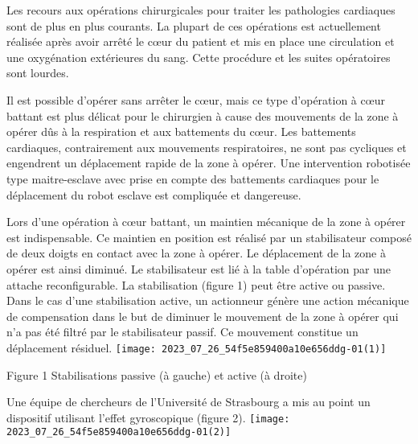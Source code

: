 %
%
%
%
%

Les recours aux opérations chirurgicales pour traiter les pathologies cardiaques sont de plus en plus courants. La plupart de ces opérations est actuellement réalisée après avoir arrêté le cœur du patient et mis en place une circulation et une oxygénation extérieures du sang. Cette procédure et les suites opératoires sont lourdes.

Il est possible d'opérer sans arrêter le cœur, mais ce type d'opération à cœur battant est plus délicat pour le chirurgien à cause des mouvements de la zone à opérer dûs à la respiration et aux battements du cœur. Les battements cardiaques, contrairement aux mouvements respiratoires, ne sont pas cycliques et engendrent un déplacement rapide de la zone à opérer. Une intervention robotisée type maitre-esclave avec prise en compte des battements cardiaques pour le déplacement du robot esclave est compliquée et dangereuse.

Lors d'une opération à cœur battant, un maintien mécanique de la zone à opérer est indispensable. Ce maintien en position est réalisé par un stabilisateur composé de deux doigts en contact avec la zone à opérer. Le déplacement de la zone à opérer est ainsi diminué. Le stabilisateur est lié à la table d'opération par une attache reconfigurable. La stabilisation (figure 1) peut être active ou passive. Dans le cas d'une stabilisation active, un actionneur génère une action mécanique de compensation dans le but de diminuer le mouvement de la zone à opérer qui n'a pas été filtré par le stabilisateur passif. Ce mouvement constitue un déplacement résiduel.
\texttt{[image: 2023\_07\_26\_54f5e859400a10e656ddg-01(1)]}

Figure 1 Stabilisations passive (à gauche) et active (à droite)

Une équipe de chercheurs de l'Université de Strasbourg a mis au point un dispositif utilisant l'effet gyroscopique (figure 2).
\texttt{[image: 2023\_07\_26\_54f5e859400a10e656ddg-01(2)]}

